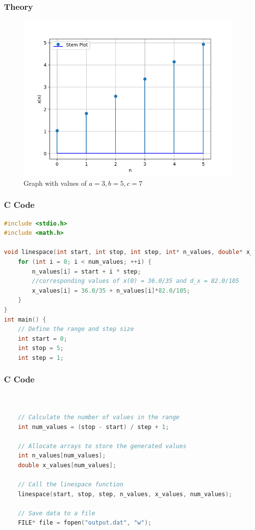 \documentclass{beamer}
\begin{document}
\begin{frame}
\frametitle{Theory}
\begin{figure}[h]
    \centering
    \includegraphics[width=\columnwidth]{./figs/fig1.png}
    \caption{Graph with values of $a = 3, b = 5, c = 7$ }
\end{figure}
\end{frame}

\begin{frame}[fragile]
\frametitle{C Code}
\begin{lstlisting}[language=C]
#include <stdio.h>
#include <math.h>

void linespace(int start, int stop, int step, int* n_values, double* x_values, int num_values) {
    for (int i = 0; i < num_values; ++i) {
        n_values[i] = start + i * step;
        //corresponding values of x(0) = 36.0/35 and d_x = 82.0/105
        x_values[i] = 36.0/35 + n_values[i]*82.0/105;
    }
}
int main() {
    // Define the range and step size
    int start = 0;
    int stop = 5;
    int step = 1;
\end{lstlisting}
\end{frame}

\begin{frame}[fragile]
\frametitle{C Code}
\begin{lstlisting}[language=C]


    // Calculate the number of values in the range
    int num_values = (stop - start) / step + 1;

    // Allocate arrays to store the generated values
    int n_values[num_values];
    double x_values[num_values];

    // Call the linespace function
    linespace(start, stop, step, n_values, x_values, num_values);

    // Save data to a file
    FILE* file = fopen("output.dat", "w");
\end{lstlisting}
\end{frame}
\end{document}
